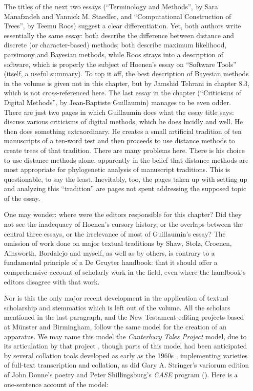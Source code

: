 \documentclass{article}
\begin{document}
The titles of the next two essays (``Terminology and Methods'',
by Sara Manafzadeh and Yannick M. Staedler, and ``Computational
Construction of Trees'', by Teemu Roos) suggest a clear differentiation.
Yet, both authors write essentially the same essay: both describe the
difference between distance and discrete (or character-based) methods;
both describe maximum likelihood, parsimony and Bayesian methods, while
Roos strays into a description of software, which is properly the
subject of Hoenen's essay on ``Software Tools'' (itself, a useful
summary). To top it off, the best description of Bayesian methods in the
volume is given not in this chapter, but by Jamshid Tehrani in chapter
8.3, which is not cross-referenced here. The last essay in the chapter
(``Criticisms of Digital Methods'', by Jean-Baptiste Guillaumin) manages
to be even odder. There are just two pages in which Guillaumin does what
the essay title says: discuss various criticisms of digital methods,
which he does lucidly and well. He then does something extraordinary. He
creates a small artificial tradition of ten manuscripts of a ten-word
test and then proceeds to use distance methods to create trees of that
tradition. There are many problems here. There is his choice to use
distance methods alone, apparently in the belief that distance methods
are most appropriate for phylogenetic analysis of manuscript traditions.
This is questionable, to say the least. Inevitably, too, the pages taken
up with setting up and analyzing this ``tradition'' are pages not spent
addressing the supposed topic of the essay.

One may wonder: where were the editors responsible for this
chapter? Did they not see the inadequacy of Hoenen's cursory history, or
the overlaps between the central three essays, or the irrelevance of
most of Guillaumin's essay? The omission of work done on major textual
traditions by Shaw, Stolz, Croenen, Ainsworth, Bordalejo and myself, as
well as by others, is contrary to a fundamental principle of a De
Gruyter handbook: that it should offer a comprehensive account of
scholarly work in the field, even where the handbook's editors disagree
with that work.

Nor is this the only major recent development in the
application of textual scholarship and stemmatics which is left out of
the volume. All the scholars mentioned in the last paragraph, and the
New Testament editing projects based at Münster and Birmingham, follow
the same model for the creation of an apparatus. We may name this model
the \emph{Canterbury Tales Project} model, due to its articulation by
that project \parencite{robinson_canterbury_1993}, though parts of this model had been
anticipated by several collation tools developed as early as the 1960s \parencite{hockey_guide_1980}, implementing varieties of full-text transcription and
collation, as did Gary A. Stringer's variorum edition of John Donne's
poetry \parencite{donne_digitaldonne_1981} and Peter Shillingsburg's \emph{CASE} program
(\citeyear{shillingsburg_scholarly_1986}). Here is a one-sentence account of the model:
\end{document}
